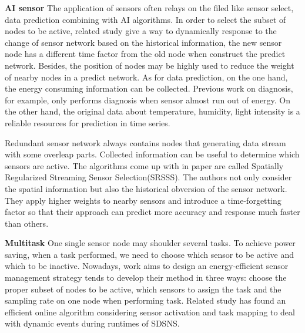 \textbf{AI sensor}
The application of sensors often relays on the filed like sensor select, data prediction combining with AI algorithms. In order to select the subset of nodes to be active, related study give a way to dynamically response to the change of sensor network based on the historical information, the new sensor node has a different time factor from the old node when construct the predict network. Besides, the position of nodes may be highly used to reduce the weight of nearby nodes in a predict network. As for data prediction, on the one hand, the energy consuming information can be collected. Previous work on diagnosis, for example, only performs diagnosis when sensor almost run out of energy. On the other hand, the original data about temperature, humidity, light intensity is a reliable resources for prediction in time series. 

Redundant sensor network always contains nodes that generating data stream with some overleap parts. Collected information can be useful to determine which sensors are active. The algorithms come up with in paper\cite{li2016spatially} are called Spatially Regularized Streaming Sensor Selection(SRSSS). The authors not only consider the spatial information but also the historical obversion of the sensor network. They apply higher weights to nearby sensors and introduce a time-forgetting factor so that their approach can predict more accuracy and response much faster than others.
	
\textbf{Multitask}
One single sensor node may shoulder several tasks. To achieve power saving, when a task performed, we need to choose which sensor to be active and which to be inactive. Nowadays, work aims to design an energy-efficient sensor management strategy tends to develop their method in three ways: choose the proper subset of nodes to be active, which sensors to assign the task and the sampling rate on one node when performing task. Related study has found an efficient online algorithm considering sensor activation and task mapping to deal with dynamic events during runtimes of SDSNS.
